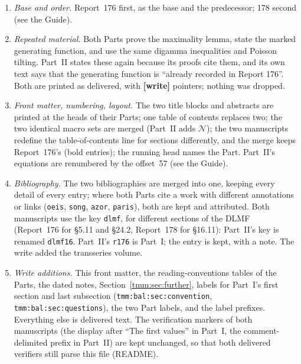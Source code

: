 \documentclass[11pt,letterpaper]{article}
\theoremstyle{remark}\newtheorem{remark}[theorem]{Remark}
\newcommand{\Normal}{\mathcal N}
\begin{document}
\begin{enumerate}
\item \emph{Base and order.} Report~176 first, as the base and the predecessor; 178 second (see the Guide).
\item \emph{Repeated material.} Both Parts prove the maximality lemma, state the marked generating function, and use the same digamma inequalities and Poisson tilting. Part~II states these again because its proofs cite them, and its own text says that the generating function is ``already recorded in Report 176''. Both are printed as delivered, with \textbf{[write]} pointers; nothing was dropped.
\item \emph{Front matter, numbering, layout.} The two title blocks and abstracts are printed at the heads of their Parts; one table of contents replaces two; the two identical macro sets are merged (Part~II adds $\Normal$); the two manuscripts redefine the table-of-contents line for sections differently, and the merge keeps Report~176's (bold entries); the running head names the Part. Part~II's equations are renumbered by the offset~57 (see the Guide).
\item \emph{Bibliography.} The two bibliographies are merged into one, keeping every detail of every entry; where both Parts cite a work with different annotations or links (\texttt{oeis}, \texttt{song}, \texttt{azor}, \texttt{paris}), both are kept and attributed. Both manuscripts use the key \texttt{dlmf}, for different sections of the DLMF (Report~176 for \S5.11 and \S24.2, Report~178 for \S16.11): Part~II's key is renamed \texttt{dlmf16}. Part~II's \texttt{r176} is Part~I; the entry is kept, with a note. The write added the transseries volume.
\item \emph{Write additions.} This front matter, the reading-conventions tables of the Parts, the dated notes, Section~\ref{tmm:sec:further}, labels for Part~I's first section and last subsection (\texttt{tmm:bal:sec:convention}, \texttt{tmm:bal:sec:questions}), the two Part labels, and the label prefixes. Everything else is delivered text. The verification markers of both manuscripts (the display after ``The first values'' in Part~I, the comment-delimited prefix in Part~II) are kept unchanged, so that both delivered verifiers still parse this file (README).
\end{enumerate}
\end{document}
